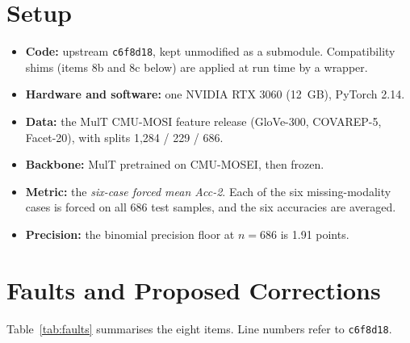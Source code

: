 \documentclass[lettersize,journal]{IEEEtran}
\begin{document}
\section{Setup}
\begin{itemize}
\item \textbf{Code:} upstream \texttt{c6f8d18}, kept unmodified as a submodule. Compatibility shims (items 8b and 8c below) are applied at run time by a wrapper.
\item \textbf{Hardware and software:} one NVIDIA RTX 3060 (12~GB), PyTorch 2.14.
\item \textbf{Data:} the MulT CMU-MOSI feature release (GloVe-300, COVAREP-5, Facet-20), with splits 1,284 / 229 / 686.
\item \textbf{Backbone:} MulT pretrained on CMU-MOSEI, then frozen.
\item \textbf{Metric:} the \emph{six-case forced mean Acc-2}. Each of the six missing-modality cases is forced on all 686 test samples, and the six accuracies are averaged.
\item \textbf{Precision:} the binomial precision floor at $n=686$ is 1.91 points.
\end{itemize}

\section{Faults and Proposed Corrections}
Table~\ref{tab:faults} summarises the eight items. Line numbers refer to \texttt{c6f8d18}.
\end{document}
